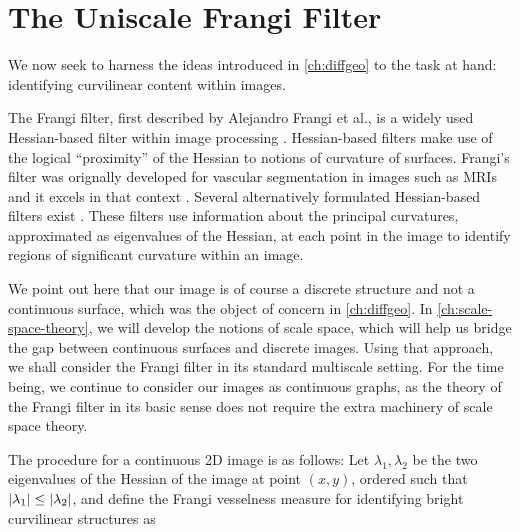 \chapter{The Uniscale Frangi Filter} \label{ch:unifrangi}

	We now seek to harness the ideas introduced in \cref{ch:diffgeo} to the task at hand: identifying curvilinear content within images.

The Frangi filter, first described by Alejandro Frangi et al., is a widely used  Hessian-based filter
within image processing \autocite{frangi-paper}. Hessian-based filters make use of the
logical ``proximity'' of the Hessian to notions of curvature of surfaces. Frangi's filter was orignally developed for vascular segmentation in images such as MRIs and it excels in that context \autocite{frangi-paper}.
Several alternatively formulated Hessian-based filters exist \autocite{sato-filter,lorenz-filter,olabarriaga-hessian-comparison}. These filters use information about the principal curvatures, approximated as eigenvalues of the Hessian, at each point in the image
to identify regions of significant curvature within an image.

We point out here that our image is of course a discrete structure and not a continuous surface, which was the object of concern in \cref{ch:diffgeo}.
In \cref{ch:scale-space-theory}, we will develop the notions of scale space, which will help us bridge the gap between continuous surfaces and discrete images. Using that approach, we shall consider the Frangi filter in its standard multiscale setting. For the time being, we continue to consider our images as continuous graphs, as the theory of the Frangi filter in its basic sense does not require the extra machinery of scale space theory.


The procedure for a continuous 2D image is as follows:
Let $\lambda_1, \lambda_2$ be the two eigenvalues of the Hessian of the image at point $(x, y)$,
ordered such that $\vert\lambda_1\vert \leq \vert\lambda_2\vert$, and define the Frangi vesselness measure for identifying bright curvilinear structures as %

